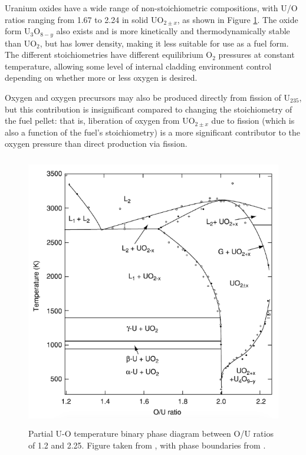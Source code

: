 Uranium oxides have a wide range of non-stoichiometric compositions, with U/O ratios ranging from 1.67 to 2.24 in solid UO$_{2 \pm x}$, as shown in Figure \ref{figure:U_O_phase_diagram}. The oxide form U$_{3}$O$_{8-y}$ also exists and is more kinetically and thermodynamically stable than UO$_{2}$, but has lower density, making it less suitable for use as a fuel form. The different stoichiometries have different equilibrium O$_{2}$ pressures at constant temperature, allowing some level of internal cladding environment control depending on whether more or less oxygen is desired. 

Oxygen and oxygen precursors may also be produced directly from fission of U$_{235}$, but this contribution is insignificant compared to changing the stoichiometry of the fuel pellet: that is, liberation of oxygen from UO$_{2 \pm x}$ due to fission (which is also a function of the fuel's stoichiometry) is a more significant contributor to the oxygen pressure than direct production via fission.

\begin{figure}[ht!]
\centering
\includegraphics[height=12cm]{images/UO_phase_diagram.png}
\caption[Partial U-O temperature binary phase diagram between O/U ratios of 1.2 and 2.25.]{Partial U-O temperature binary phase diagram between O/U ratios of 1.2 and 2.25. Figure taken from \cite{katz2007chemistry}, with phase boundaries from \cite{rand1978thermodynamic, chevalier2002progress, gueneau2002thermodynamic}.}
\label{figure:U_O_phase_diagram}
\end{figure}


